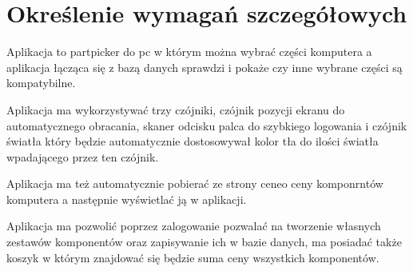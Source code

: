 \newpage
\section{Określenie wymagań szczegółowych}		%


\hspace{0.60cm}Aplikacja to partpicker do pc w którym można wybrać części komputera
a aplikacja łącząca się z bazą danych sprawdzi i pokaże czy inne wybrane części są kompatybilne.

\hspace{0.60cm}Aplikacja ma wykorzystywać trzy czójniki, czójnik pozycji ekranu do automatycznego obracania,
skaner odcisku palca do szybkiego logowania i czójnik światła który będzie automatycznie dostosowywał kolor tła do ilości światła wpadającego przez ten czójnik.

\hspace{0.60cm}Aplikacja ma też automatycznie pobierać ze strony ceneo ceny komponrntów komputera
a następnie wyświetlać ją w aplikacji.

\hspace{0.60cm}Aplikacja ma pozwolić poprzez zalogowanie pozwalać na tworzenie własnych zestawów komponentów oraz 
zapisywanie ich w bazie danych, ma posiadać także koszyk w którym znajdować się będzie suma ceny wszystkich komponentów.